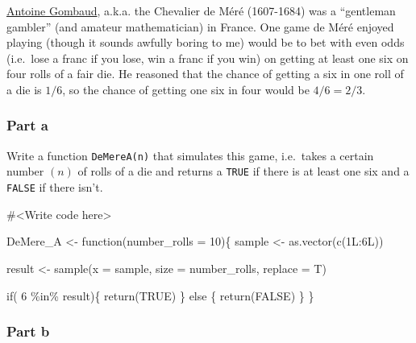 \documentclass[
  letterpaper,
  DIV=11,
  numbers=noendperiod]{scrartcl}
\newenvironment{Shaded}{\begin{snugshade}}{\end{snugshade}}
\newcommand{\AttributeTok}[1]{\textcolor[rgb]{0.40,0.45,0.13}{#1}}
\newcommand{\CommentTok}[1]{\textcolor[rgb]{0.37,0.37,0.37}{#1}}
\newcommand{\ConstantTok}[1]{\textcolor[rgb]{0.56,0.35,0.01}{#1}}
\newcommand{\ControlFlowTok}[1]{\textcolor[rgb]{0.00,0.23,0.31}{#1}}
\newcommand{\DecValTok}[1]{\textcolor[rgb]{0.68,0.00,0.00}{#1}}
\newcommand{\FunctionTok}[1]{\textcolor[rgb]{0.28,0.35,0.67}{#1}}
\newcommand{\NormalTok}[1]{\textcolor[rgb]{0.00,0.23,0.31}{#1}}
\newcommand{\OtherTok}[1]{\textcolor[rgb]{0.00,0.23,0.31}{#1}}
\newcommand{\SpecialCharTok}[1]{\textcolor[rgb]{0.37,0.37,0.37}{#1}}
\begin{document}
\href{https://en.wikipedia.org/wiki/Antoine_Gombaud}{Antoine Gombaud},
a.k.a. the Chevalier de Méré (1607-1684) was a ``gentleman gambler''
(and amateur mathematician) in France. One game de Méré enjoyed playing
(though it sounds awfully boring to me) would be to bet with even odds
(i.e.~lose a franc if you lose, win a franc if you win) on getting at
least one six on four rolls of a fair die. He reasoned that the chance
of getting a six in one roll of a die is \(1/6\), so the chance of
getting one six in four would be \(4/6=2/3\).

\hypertarget{part-a-3}{%
\subsubsection{Part a}\label{part-a-3}}

Write a function \texttt{DeMereA(n)} that simulates this game,
i.e.~takes a certain number \((n)\) of rolls of a die and returns a
\texttt{TRUE} if there is at least one six and a \texttt{FALSE} if there
isn't.

\begin{Shaded}
\begin{Highlighting}[]
\CommentTok{\#\textless{}Write code here\textgreater{}}

\NormalTok{DeMere\_A }\OtherTok{\textless{}{-}} \ControlFlowTok{function}\NormalTok{(}\AttributeTok{number\_rolls =} \DecValTok{10}\NormalTok{)\{}
\NormalTok{  sample }\OtherTok{\textless{}{-}} \FunctionTok{as.vector}\NormalTok{(}\FunctionTok{c}\NormalTok{(1L}\SpecialCharTok{:}\NormalTok{6L))}
  
\NormalTok{    result }\OtherTok{\textless{}{-}} \FunctionTok{sample}\NormalTok{(}\AttributeTok{x =}\NormalTok{ sample, }\AttributeTok{size =}\NormalTok{ number\_rolls, }
                         \AttributeTok{replace =}\NormalTok{ T)}
    
    \ControlFlowTok{if}\NormalTok{( }\DecValTok{6} \SpecialCharTok{\%in\%}\NormalTok{ result)\{}
      \FunctionTok{return}\NormalTok{(}\ConstantTok{TRUE}\NormalTok{)}
\NormalTok{    \} }\ControlFlowTok{else}\NormalTok{ \{}
      \FunctionTok{return}\NormalTok{(}\ConstantTok{FALSE}\NormalTok{)}
\NormalTok{    \}}
\NormalTok{  \}}
\end{Highlighting}
\end{Shaded}

\hypertarget{part-b-3}{%
\subsubsection{Part b}\label{part-b-3}}
\end{document}
